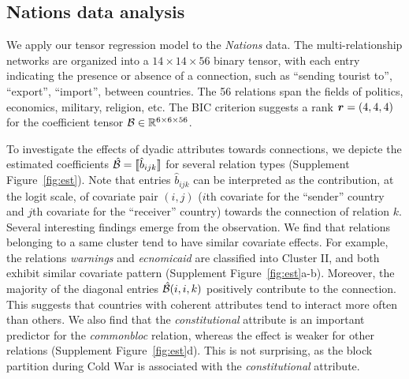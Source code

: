 \documentclass[11pt]{article}
\theoremstyle{plain}
\theoremstyle{definition}
\begin{document}
\subsection{Nations data analysis}
We apply our tensor regression model to the \emph{Nations} data. The multi-relationship networks are organized into a $14 \times 14 \times 56$ binary tensor, with each entry indicating the presence or absence of a connection, such as ``sending tourist to'', ``export'', ``import'', between countries. The 56 relations span the fields of politics, economics, military, religion, etc.  The BIC criterion suggests a rank $\bm{r}=(4,4,4)$ for the coefficient tensor $\mathcal{B}\in\mathbb{R}^{6\times 6 \times 56}$.

To investigate the effects of dyadic attributes towards connections, we depicte the estimated coefficients $\hat {\mathcal{B}}=\llbracket \hat b_{ijk} \rrbracket$ for several relation types (Supplement Figure~\ref{fig:est}). Note that entries $\hat b_{ijk}$ can be interpreted as the contribution, at the logit scale, of covariate pair $(i,j)$ ($i$th covariate for the ``sender'' country and $j$th covariate for the ``receiver'' country) towards the connection of relation $k$.  Several interesting findings emerge from the observation. We find that relations belonging to a same cluster tend to have similar covariate effects. For example, the relations \emph{warnings} and \emph{ecnomicaid} are classified into Cluster II, and both exhibit similar covariate pattern (Supplement Figure~\ref{fig:est}a-b). Moreover, the majority of the diagonal entries $\hat {\mathcal{B}}(i,i,k)$ positively contribute to the connection. This suggests that countries with coherent attributes tend to interact more often than others. We also find that the \emph{constitutional} attribute is an important predictor for the \emph{commonbloc} relation, whereas the effect is weaker for other relations (Supplement Figure~\ref{fig:est}d). This is not surprising, as the block partition during Cold War is associated with the \emph{constitutional} attribute. 
\end{document}
